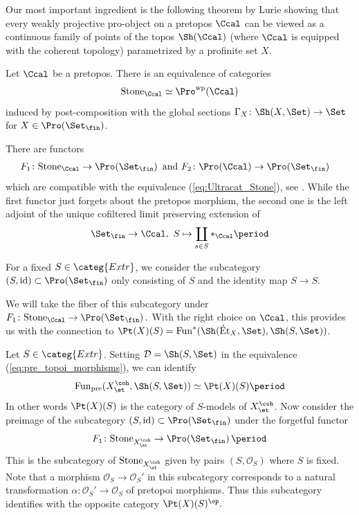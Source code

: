 \documentclass[leqno]{article}
\renewcommand{\Fun}{\mathrm{Fun}}
\DeclareMathOperator{\FinSet}{\Set_{\fin}}
\DeclareMathOperator{\ProFin}{\Pro(\FinSet)}
\newcommand{\Extr}{\categ{Extr}}
\newcommand{\Et}[1]{\mathrm{\acute{E}t}_{#1}}
\begin{document}
%
Our most important ingredient is the following theorem by Lurie showing that every weakly projective pro-object on a pretopos $\Ccal$ can be viewed as a continuous family of points of the topos $\Sh(\Ccal)$ (where $\Ccal$ is equipped with the coherent topology) parametrized by a profinite set $X$.
\begin{theorem}{\cite[Theorem 6.3.14]{Ultracategories}}
Let $\Ccal$ be a pretopos.
There is an equivalence of categories
\begin{align}\label{eq:Ultracat_Stone}
\mathrm{Stone}_{\Ccal} \simeq \Pro^{\mathrm{wp}}(\Ccal) 
\end{align}
induced by post-composition with the global sections $\Gamma_X\colon \Sh(X,\Set) \rightarrow \Set$ for $X\in \ProFin$.    
\end{theorem}
\begin{recollection}
There are functors
\begin{align}
&F_1\colon\mathrm{Stone}_{\Ccal} \rightarrow \ProFin \text{ and } F_2\colon \Pro(\Ccal)\rightarrow \ProFin \end{align} which are compatible with the equivalence (\ref{eq:Ultracat_Stone}), see  \cite[Construction 6.4.3]{Ultracategories}.
While the first functor just forgets about the pretopos morphism, the second one is the left adjoint of the unique cofiltered limit preserving extension of $$\FinSet \rightarrow \Ccal, \ S \mapsto \coprod_{s \in S} \ast_{\Ccal}\period$$
\end{recollection}
\begin{notation}
For a fixed $S\in \Extr$, we consider the subcategory $(S,\mathrm{id})\subset \ProFin$ only consisting of $S$ and the identity map $S\rightarrow S$.  
\end{notation}
%
We will take the fiber of this subcategory under $F_1\colon \mathrm{Stone}_{\Ccal} \rightarrow \ProFin.$  
With the right choice on $\Ccal$, this provides us with the connection to $\Pt(X)(S)=\Fun^*(\Sh(\Et{X},\Set),\Sh(S,\Set))$.
%
\begin{observation}
Let $S\in \Extr$. Setting $\mathcal{D}=\Sh(S, \Set)$ in the equivalence (\ref{eq:pre_topoi_morphisms}), we can identify
$$\Fun_{\mathrm{pre}}(X_{\et}^{\coh}, \Sh(S, \Set))\simeq \Pt(X)(S)\period $$
In other words $\Pt(X)(S)$ is the category of $S$-models of $X_{\et}^{\coh}$.
Now consider the preimage of the subcategory $(S,\mathrm{id})\subset\ProFin$ under the forgetful functor $$F_1\colon \mathrm{Stone}_{X_{\et}^{\coh}}\rightarrow \ProFin \period $$  This is the subcategory of $\mathrm{Stone}_{X_{\et}^{\coh}}$ given by  pairs $(S,\mathcal{O}_S)$ where $S$ is fixed. Note that a morphism $\mathcal{O}_S \rightarrow \mathcal{O}_S'$ in this subcategory corresponds to a natural transformation $\alpha\colon \mathcal{O}_S'\rightarrow \mathcal{O}_S$ of pretopoi morphisms. Thus this subcategory identifies with the opposite category $\Pt(X)(S)^{\op}.$ 
\end{observation}
\end{document}
